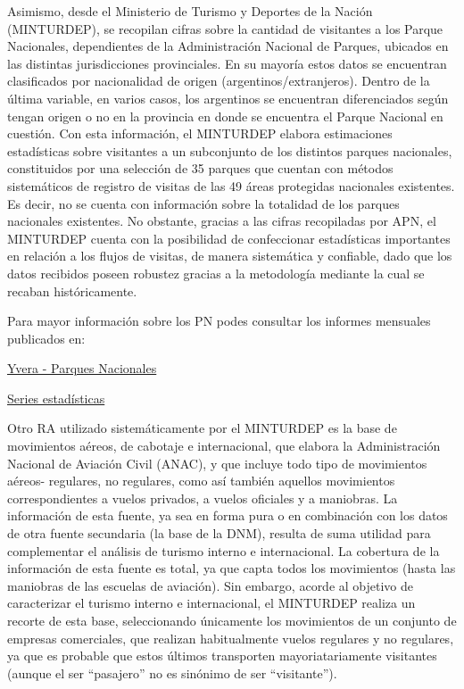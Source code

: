 \documentclass[
]{book}
\begin{document}
Asimismo, desde el Ministerio de Turismo y Deportes de la Nación (MINTURDEP), se recopilan cifras sobre la cantidad de visitantes a los Parque Nacionales, dependientes de la Administración Nacional de Parques, ubicados en las distintas jurisdicciones provinciales. En su mayoría estos datos se encuentran clasificados por nacionalidad de origen (argentinos/extranjeros). Dentro de la última variable, en varios casos, los argentinos se encuentran diferenciados según tengan origen o no en la provincia en donde se encuentra el Parque Nacional en cuestión. Con esta información, el MINTURDEP elabora estimaciones estadísticas sobre visitantes a un subconjunto de los distintos parques nacionales, constituidos por una selección de 35 parques que cuentan con métodos sistemáticos de registro de visitas de las 49 áreas protegidas nacionales existentes. Es decir, no se cuenta con información sobre la totalidad de los parques nacionales existentes. No obstante, gracias a las cifras recopiladas por APN, el MINTURDEP cuenta con la posibilidad de confeccionar estadísticas importantes en relación a los flujos de visitas, de manera sistemática y confiable, dado que los datos recibidos poseen robustez gracias a la metodología mediante la cual se recaban históricamente.

Para mayor información sobre los PN podes consultar los informes mensuales publicados en:

\href{https://www.yvera.tur.ar/estadistica/info/parques-nacionales}{Yvera - Parques Nacionales}

\href{http://datos.yvera.gob.ar/dataset/parques-nacionales}{Series estadísticas}

Otro RA utilizado sistemáticamente por el MINTURDEP es la base de movimientos aéreos, de cabotaje e internacional, que elabora la Administración Nacional de Aviación Civil (ANAC), y que incluye todo tipo de movimientos aéreos- regulares, no regulares, como así también aquellos movimientos correspondientes a vuelos privados, a vuelos oficiales y a maniobras. La información de esta fuente, ya sea en forma pura o en combinación con los datos de otra fuente secundaria (la base de la DNM), resulta de suma utilidad para complementar el análisis de turismo interno e internacional. La cobertura de la información de esta fuente es total, ya que capta todos los movimientos (hasta las maniobras de las escuelas de aviación). Sin embargo, acorde al objetivo de caracterizar el turismo interno e internacional, el MINTURDEP realiza un recorte de esta base, seleccionando únicamente los movimientos de un conjunto de empresas comerciales, que realizan habitualmente vuelos regulares y no regulares, ya que es probable que estos últimos transporten mayoriatariamente visitantes (aunque el ser ``pasajero'' no es sinónimo de ser ``visitante'').
\end{document}
